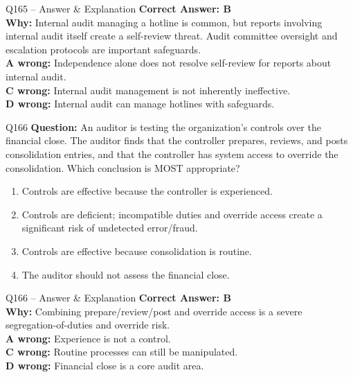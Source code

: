 \documentclass[aspectratio=169,10pt]{beamer}
\begin{document}
	\begin{frame}[t]{Q165 -- Answer \& Explanation}
		\small
		\textbf{Correct Answer: B} \\[4pt]
		\textbf{Why:} Internal audit managing a hotline is common, but reports involving internal audit itself create a self-review threat. Audit committee oversight and escalation protocols are important safeguards. \\[4pt]
		\textbf{A wrong:} Independence alone does not resolve self-review for reports about internal audit. \\[2pt]
		\textbf{C wrong:} Internal audit management is not inherently ineffective. \\[2pt]
		\textbf{D wrong:} Internal audit can manage hotlines with safeguards.
	\end{frame}
	
	\begin{frame}[t]{Q166}
		\small
		\textbf{Question:} An auditor is testing the organization's controls over the financial close. The auditor finds that the controller prepares, reviews, and posts consolidation entries, and that the controller has system access to override the consolidation. Which conclusion is MOST appropriate?
		\begin{enumerate}[label=\Alph*.,itemsep=1pt,topsep=2pt]
			\item Controls are effective because the controller is experienced.
			\item Controls are deficient; incompatible duties and override access create a significant risk of undetected error/fraud.
			\item Controls are effective because consolidation is routine.
			\item The auditor should not assess the financial close.
		\end{enumerate}
	\end{frame}
	
	\begin{frame}[t]{Q166 -- Answer \& Explanation}
		\small
		\textbf{Correct Answer: B} \\[4pt]
		\textbf{Why:} Combining prepare/review/post and override access is a severe segregation-of-duties and override risk. \\[4pt]
		\textbf{A wrong:} Experience is not a control. \\[2pt]
		\textbf{C wrong:} Routine processes can still be manipulated. \\[2pt]
		\textbf{D wrong:} Financial close is a core audit area.
	\end{frame}
	
\end{document}
